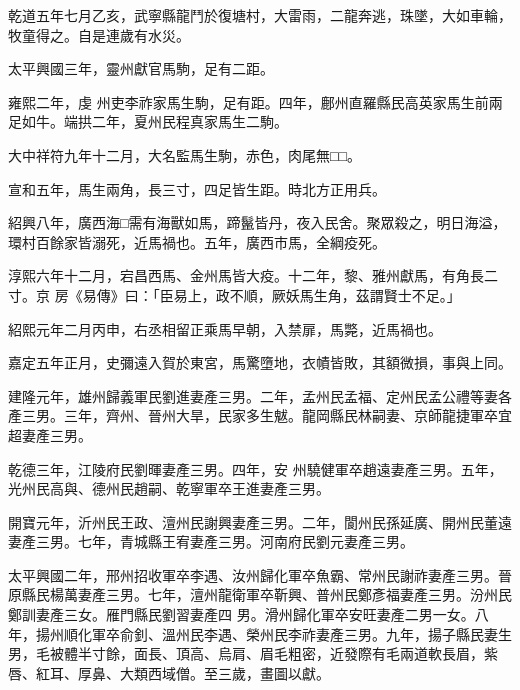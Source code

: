 \begin{pinyinscope}
 乾道五年七月乙亥，武寧縣龍鬥於復塘村，大雷雨，二龍奔逃，珠墜，大如車輪，牧童得之。自是連歲有水災。



 太平興國三年，靈州獻官馬駒，足有二距。



 雍熙二年，虔
 州吏李祚家馬生駒，足有距。四年，鄜州直羅縣民高英家馬生前兩足如牛。端拱二年，夏州民程真家馬生二駒。



 大中祥符九年十二月，大名監馬生駒，赤色，肉尾無□□。



 宣和五年，馬生兩角，長三寸，四足皆生距。時北方正用兵。



 紹興八年，廣西海□需有海獸如馬，蹄鬣皆丹，夜入民舍。聚眾殺之，明日海溢，環村百餘家皆溺死，近馬禍也。五年，廣西市馬，全綱疫死。



 淳熙六年十二月，宕昌西馬、金州馬皆大疫。十二年，黎、雅州獻馬，有角長二寸。京
 房《易傳》曰：「臣易上，政不順，厥妖馬生角，茲謂賢士不足。」



 紹熙元年二月丙申，右丞相留正乘馬早朝，入禁扉，馬斃，近馬禍也。



 嘉定五年正月，史彌遠入賀於東宮，馬驚墮地，衣幘皆敗，其額微損，事與上同。



 建隆元年，雄州歸義軍民劉進妻產三男。二年，孟州民孟福、定州民孟公禮等妻各產三男。三年，齊州、晉州大旱，民家多生魃。龍岡縣民林嗣妻、京師龍捷軍卒宜超妻產三男。



 乾德三年，江陵府民劉暉妻產三男。四年，安
 州驍健軍卒趙遠妻產三男。五年，光州民高與、德州民趙嗣、乾寧軍卒王進妻產三男。



 開寶元年，沂州民王政、澶州民謝興妻產三男。二年，閬州民孫延廣、開州民董遠妻產三男。七年，青城縣王宥妻產三男。河南府民劉元妻產三男。



 太平興國二年，邢州招收軍卒李遇、汝州歸化軍卒魚霸、常州民謝祚妻產三男。晉原縣民楊萬妻產三男。七年，澶州龍衛軍卒靳興、普州民鄭彥福妻產三男。汾州民鄭訓妻產三女。雁門縣民劉習妻產四
 男。滑州歸化軍卒安旺妻產二男一女。八年，揚州順化軍卒俞釗、溫州民李遇、榮州民李祚妻產三男。九年，揚子縣民妻生男，毛被體半寸餘，面長、頂高、烏肩、眉毛粗密，近發際有毛兩道軟長眉，紫唇、紅耳、厚鼻、大類西域僧。至三歲，畫圖以獻。




\end{pinyinscope}
